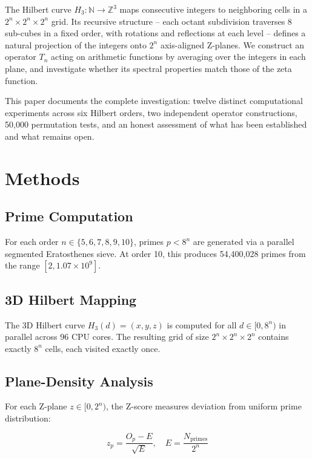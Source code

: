 \documentclass[11pt,a4paper]{article}
\begin{document}
The Hilbert curve $H_3: \mathbb{N} \to \mathbb{Z}^3$ maps consecutive
integers to neighboring cells in a $2^n \times 2^n \times 2^n$ grid.
Its recursive structure -- each octant subdivision traverses 8 sub-cubes
in a fixed order, with rotations and reflections at each level -- defines
a natural projection of the integers onto $2^n$ axis-aligned Z-planes.
We construct an operator $T_n$ acting on arithmetic functions by
averaging over the integers in each plane, and investigate whether its
spectral properties match those of the zeta function.

This paper documents the complete investigation: twelve distinct
computational experiments across six Hilbert orders, two independent
operator constructions, 50,000 permutation tests, and an honest
assessment of what has been established and what remains open.

\section{Methods}

\subsection{Prime Computation}

For each order $n \in \{5, 6, 7, 8, 9, 10\}$, primes $p < 8^n$ are
generated via a parallel segmented Eratosthenes sieve.  At order 10,
this produces 54,400,028 primes from the range $[2, 1.07 \times
10^9]$.

\subsection{3D Hilbert Mapping}

The 3D Hilbert curve $H_3(d) = (x,y,z)$ is computed for all $d \in
[0, 8^n)$ in parallel across 96 CPU cores.  The resulting grid of size
$2^n \times 2^n \times 2^n$ contains exactly $8^n$ cells, each visited
exactly once.

\subsection{Plane-Density Analysis}

For each Z-plane $z \in [0, 2^n)$, the Z-score measures deviation from
uniform prime distribution:

\begin{equation}
z_p = \frac{O_p - E}{\sqrt{E}}, \quad E = \frac{N_{\text{primes}}}{2^n}
\end{equation}
\end{document}
